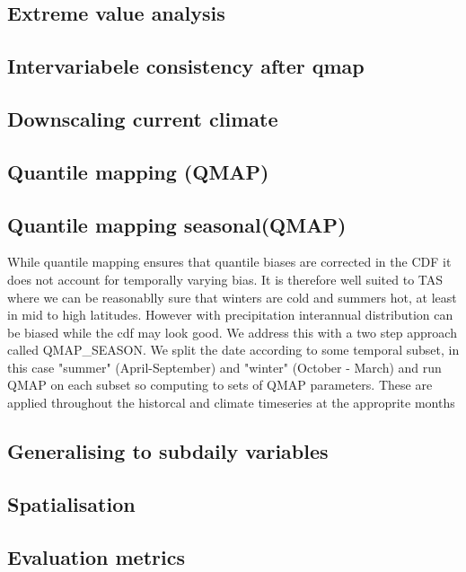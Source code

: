 \documentclass[hess, manuscript]{copernicus}
\begin{document}
\subsection{Extreme value analysis}
\subsection{Intervariabele consistency after qmap}
\subsection{Downscaling current climate}


\subsection{Quantile mapping (QMAP)}

\subsection{Quantile mapping seasonal(QMAP)}
While quantile mapping ensures that quantile biases are corrected in the CDF it does not account for temporally varying bias. It is therefore well suited to TAS where we can be reasonablly sure that winters are cold and summers hot, at least in mid to high latitudes. However with precipitation interannual distribution can be biased while the cdf may look good. We address this with a two step approach called QMAP\_SEASON. We split the date according to some temporal subset, in this case "summer" (April-September) and "winter" (October - March) and run QMAP on each subset so computing to sets of QMAP parameters. These are applied throughout the historcal and climate timeseries at the approprite months

\subsection{Generalising to subdaily variables}

\subsection{Spatialisation}
\subsection{Evaluation metrics}
\end{document}
